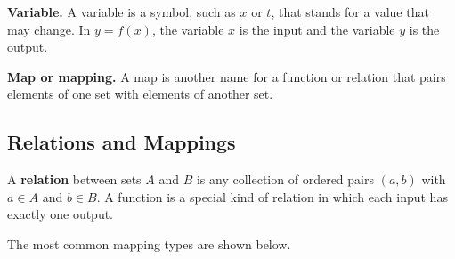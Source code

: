 \documentclass[12pt]{article}
\theoremstyle{definition}
\begin{document}
\textbf{Variable.} A variable is a symbol, such as $x$ or $t$, that stands for a value that may change. In $y=f(x)$, the variable $x$ is the input and the variable $y$ is the output.

\textbf{Map or mapping.} A map is another name for a function or relation that pairs elements of one set with elements of another set.

\subsection{Relations and Mappings}

A \textbf{relation} between sets $A$ and $B$ is any collection of ordered pairs $(a,b)$ with $a \in A$ and $b \in B$. A function is a special kind of relation in which each input has exactly one output.

The most common mapping types are shown below.
\end{document}
